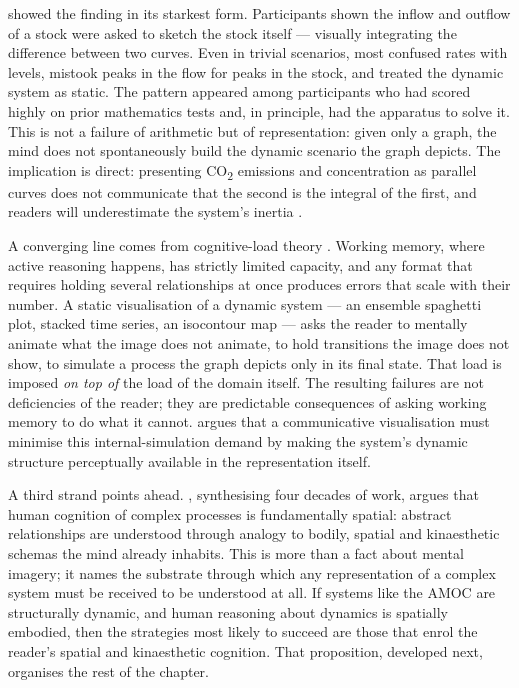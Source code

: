 \citet{cronin2009} showed the finding in its starkest form. Participants shown the inflow and outflow of a stock were asked to sketch the stock itself --- visually integrating the difference between two curves. Even in trivial scenarios, most confused rates with levels, mistook peaks in the flow for peaks in the stock, and treated the dynamic system as static. The pattern appeared among participants who had scored highly on prior mathematics tests and, in principle, had the apparatus to solve it. This is not a failure of arithmetic but of representation: given only a graph, the mind does not spontaneously build the dynamic scenario the graph depicts. The implication is direct: presenting CO\textsubscript{2} emissions and concentration as parallel curves does not communicate that the second is the integral of the first, and readers will underestimate the system's inertia \citep{sterman2008}.



A converging line comes from cognitive-load theory \citep{sweller1988, swellervanmerrienboer2019}. Working memory, where active reasoning happens, has strictly limited capacity, and any format that requires holding several relationships at once produces errors that scale with their number. A static visualisation of a dynamic system --- an ensemble spaghetti plot, stacked time series, an isocontour map --- asks the reader to mentally animate what the image does not animate, to hold transitions the image does not show, to simulate a process the graph depicts only in its final state. That load is imposed \emph{on top of} the load of the domain itself. The resulting failures are not deficiencies of the reader; they are predictable consequences of asking working memory to do what it cannot. \citet{ware2021} argues that a communicative visualisation must minimise this internal-simulation demand by making the system's dynamic structure perceptually available in the representation itself.

A third strand points ahead. \citet{tversky2019}, synthesising four decades of work, argues that human cognition of complex processes is fundamentally spatial: abstract relationships are understood through analogy to bodily, spatial and kinaesthetic schemas the mind already inhabits. This is more than a fact about mental imagery; it names the substrate through which any representation of a complex system must be received to be understood at all. If systems like the AMOC are structurally dynamic, and human reasoning about dynamics is spatially embodied, then the strategies most likely to succeed are those that enrol the reader's spatial and kinaesthetic cognition. That proposition, developed next, organises the rest of the chapter.

